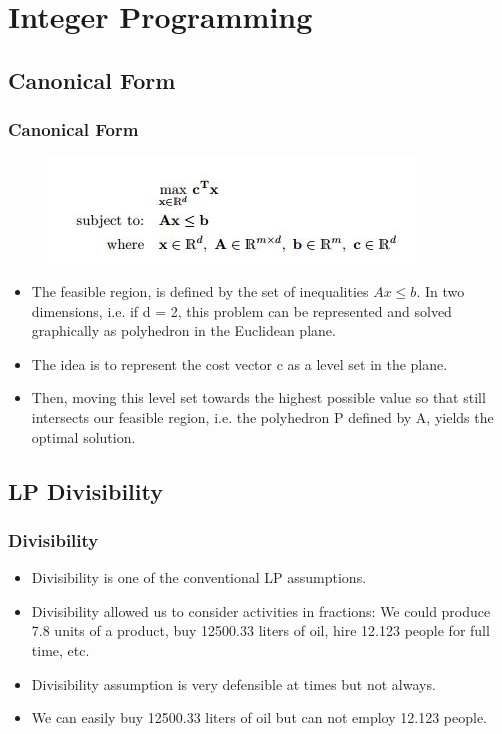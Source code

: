 \documentclass{beamer}
\begin{document}
\section{Integer Programming}
\subsection{Canonical Form}
\begin{frame}
	\frametitle{Canonical Form}
\begin{figure}
\centering
\includegraphics[width=0.7\linewidth]{canonical}

\end{figure}
\begin{itemize}
\item The feasible region, is defined by the set of inequalities $Ax \leq b$. In two
dimensions, i.e. if d = 2, this problem can be represented and solved graphically as polyhedron in the Euclidean plane.
\item  The idea
is to represent the cost vector c as a level set in the plane. 
\item Then, moving this level set
towards the highest possible value so that still intersects our feasible region, i.e. the polyhedron
P defined by A, yields the optimal solution.
\end{itemize}

\end{frame}

\subsection{LP Divisibility}
\begin{frame}
\frametitle{Divisibility}	
\begin{itemize}
\item Divisibility is one of the conventional LP assumptions.
\item Divisibility allowed us to consider activities in fractions: We could produce 7.8 units of a product,
buy 12500.33 liters of oil, hire 12.123 people for full time, etc. 
\item Divisibility assumption is very defensible at
times but not always. 
\item We can easily buy 12500.33 liters of oil but can not employ 12.123 people. 
\end{itemize}
\end{frame}
\end{document}
